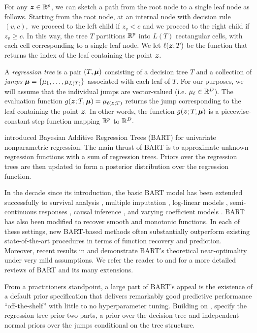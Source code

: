 For any $\bm{z} \in \mathbb{R}^{p}$, we can sketch a path from the root node to a single leaf node as follows.
Starting from the root node, at an internal node with decision rule $(v,c),$ we proceed to the left child if $z_{v} < c$ and we proceed to the right child if $z_{v} \geq c.$
In this way, the tree $T$ partitions $\mathbb{R}^{p}$ into $L(T)$ rectangular cells, with each cell corresponding to a single leaf node.
We let $\ell(\bm{z};T)$ be the function that returns the index of the leaf containing the point $\bm{z}.$

A \emph{regression tree} is a pair $(T, \boldsymbol{\mu})$ consisting of a decision tree $T$ and a collection of \emph{jumps} $\boldsymbol{\mu} = \{\mu_{1}, \ldots, \mu_{L(T)}\}$ associated with each leaf of $T.$
For our purposes, we will assume that the individual jumps are vector-valued (i.e. $\mu_{\ell} \in \mathbb{R}^{D}$).
The evaluation function $g(\bm{z}; T,\boldsymbol{\mu}) = \mu_{\ell(\bm{z};T)}$ returns the jump corresponding to the leaf containing the point $\bm{z}.$
In other words, the function $g(\bm{z};T,\boldsymbol{\mu})$ is a piecewise-constant step function mapping $\mathbb{R}^{p}$ to $\mathbb{R}^{D}.$


\citet{Chipman2010} introduced Bayesian Additive Regression Trees (BART) for univariate nonparametric regression.
The main thrust of BART is to approximate unknown regression functions with a sum of regression trees.
Priors over the regression trees are then updated to form a posterior distribution over the regression function.

In the decade since its introduction, the basic BART model has been extended successfully to survival analysis \citep{Sparapani2016}, multiple imputation \citep{Xu2016}, log-linear models \citep{Murray2019}, semi-continuous responses \citep{Linero2019}, causal inference \citep{Hill2011, Hahn2020}, and varying coefficient models \citep{Deshpande2020}.
BART has also been modified to recover smooth \citep{LineroYang2018, Starling2019} and monotonic \citep{Chipman2019, Starling2020} functions.
In each of these settings, new BART-based methods often substantially outperform existing state-of-the-art procedures in terms of function recovery and prediction.
Moreover, recent results in \citet{Rockova2019} and \citet{RockovaSaha2019} demonstrate BART's theoretical near-optimality under very mild assumptions. 
We refer the reader to \citet{Tan2019} and \citet{Hill2020} for a more detailed reviews of BART and its many extensions.

From a practitioners standpoint, a large part of BART's appeal is the existence of a default prior specification that delivers remarkably good predictive performance ``off-the-shelf'' with little to no hyperparameter tuning.
Building on \citet{Chipman1998}, \citet{Chipman2010} specify the regression tree prior two parts, a prior over the decision tree and independent normal priors over the jumps conditional on the tree structure.

